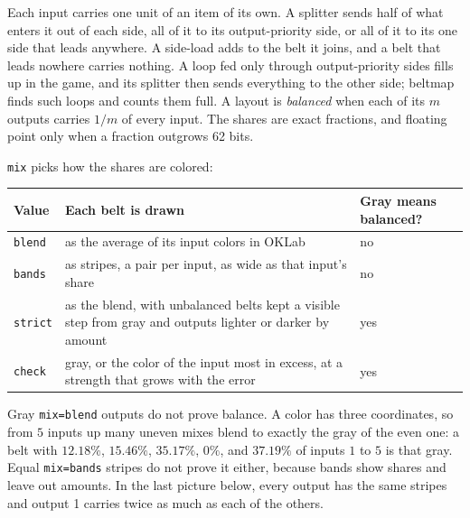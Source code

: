 \documentclass[11pt]{article}
\newcommand\key[1]{\texttt{#1}}
\begin{document}
	Each input carries one unit of an item of its own. A splitter sends half of what enters it out of each side, all of it to its output-priority side, or all of it to its one side that leads anywhere. A side-load adds to the belt it joins, and a belt that leads nowhere carries nothing. A loop fed only through output-priority sides fills up in the game, and its splitter then sends everything to the other side; \textsf{beltmap} finds such loops and counts them full. A layout is \emph{balanced} when each of its $m$ outputs carries $1/m$ of every input. The shares are exact fractions, and floating point only when a fraction outgrows 62 bits.

	\key{mix} picks how the shares are colored:

	\begin{center}
		\small
		\begin{tabularx}{\linewidth}{@{}l X l@{}}
			\toprule
			Value & Each belt is drawn & Gray means balanced? \\
			\midrule
			\key{blend} & as the average of its input colors in OKLab & no \\
			\key{bands} & as stripes, a pair per input, as wide as that input's share & no \\
			\key{strict} & as the blend, with unbalanced belts kept a visible step from gray and outputs lighter or darker by amount & yes \\
			\key{check} & gray, or the color of the input most in excess, at a strength that grows with the error & yes \\
			\bottomrule
		\end{tabularx}
	\end{center}

	Gray \key{mix=blend} outputs do not prove balance. A color has three coordinates, so from $5$ inputs up many uneven mixes blend to exactly the gray of the even one: a belt with $12.18\%$, $15.46\%$, $35.17\%$, $0\%$, and $37.19\%$ of inputs $1$ to $5$ is that gray. Equal \key{mix=bands} stripes do not prove it either, because bands show shares and leave out amounts. In the last picture below, every output has the same stripes and output 1 carries twice as much as each of the others.
\end{document}
